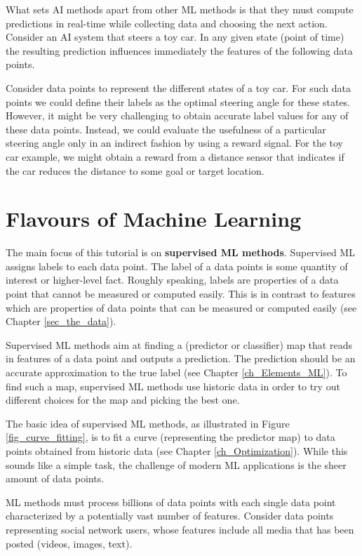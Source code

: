 \documentclass[12pt]{report}
\begin{document}
What sets AI methods apart from other ML methods is that they must 
compute predictions in real-time while collecting data and choosing 
the next action. Consider an AI system that steers a toy car. In any 
given state (point of time) the resulting prediction influences immediately 
the features of the following data points. 

Consider data points to represent the different states of a toy car. 
For such data points we  could define their labels as the optimal 
steering angle for these states. However, it might be very challenging 
to obtain accurate label values for any of these data points. Instead, 
we could evaluate the usefulness of a particular steering angle only 
in an indirect fashion by using a reward signal. For the toy car example, 
we might obtain a reward from a distance sensor that indicates if the 
car reduces the distance to some goal or target location. 


\section{Flavours of Machine Learning} 

The main focus of this tutorial is on {\bf supervised ML methods}. 
Supervised ML assigns labels to each data point. The label of a data 
points is some quantity of interest or higher-level fact. Roughly 
speaking, labels are properties of a data point that cannot be 
measured or computed easily. This is in contrast to features which 
are properties of data points that can be measured or computed 
easily (see Chapter \ref{sec_the_data}). 

Supervised ML methods aim at finding a (predictor or classifier) map 
that reads in features of a data point and outputs a prediction. The 
prediction should be an accurate approximation to the true label 
(see Chapter \ref{ch_Elements_ML}). To find such a map, supervised 
ML methods use historic data in order to try out different choices for 
the map and picking the best one. 

The basic idea of supervised ML methods, as illustrated in 
Figure \ref{fig_curve_fitting}, is to fit a curve (representing 
the predictor map) to data points obtained from historic data 
(see Chapter \ref{ch_Optimization}). While this sounds like a 
simple task, the challenge of modern ML applications is the sheer 
amount of data points. 

ML methods must process billions of data points with each 
single data point characterized by a potentially vast number 
of features. Consider data points representing social network 
users, whose features include all media that has been posted (videos, images, text). 
\end{document}
